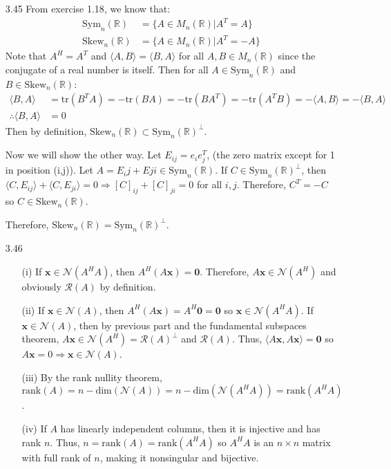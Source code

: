 \documentclass[letterpaper,12pt]{article}
\theoremstyle{definition}
\begin{document}
\begin{enumerate}
        \item[3.45]
        From exercise 1.18, we know that:
        \begin{align*}
          \text{Sym}_n(\mathbb{R}) &= \{A \in M_n(\mathbb{R}) | A^T = A\} \\
          \text{Skew}_n(\mathbb{R}) &= \{A \in M_n(\mathbb{R}) | A^T = -A\}
        \end{align*}
        Note that $A^H = A^T$ and $\langle A, B \rangle = \langle B, A \rangle$ for all $A, B \in M_n(\mathbb{R})$ since the conjugate of a real number is itself. Then for all $A \in \text{Sym}_n(\mathbb{R})$ and $B \in \text{Skew}_n(\mathbb{R})$:
          \begin{align*}
            \langle B, A \rangle &= \text{tr}(B^TA) = -\text{tr}(BA) = -\text{tr}(BA^T) = -\text{tr}(A^TB) = - \langle A, B \rangle = - \langle B, A \rangle \\
            \therefore \langle B, A \rangle &= 0
          \end{align*}
          Then by definition, $\text{Skew}_n(\mathbb{R}) \subset \text{Sym}_n(\mathbb{R})^\perp$.

          Now we will show the other way. Let $E_{ij} = e_ie_j^T$, (the zero matrix except for 1 in position (i,j)). Let $A = E_ij + Eji \in \text{Sym}_n(\mathbb{R})$. If $C \in \text{Sym}_n(\mathbb{R})^\perp$, then $\langle C, E_{ij} \rangle + \langle C, E_{ji} \rangle = 0 \Longrightarrow [C]_{ij} + [C]_{ji} = 0$ for all $i, j$. Therefore, $C^T = -C$ so $C \in \text{Skew}_n(\mathbb{R})$.

          Therefore,  $\text{Skew}_n(\mathbb{R}) = \text{Sym}_n(\mathbb{R})^\perp$.

        \item[3.46]
          \begin{enumerate}
            \item[(i)]
            If $\mathbf{x} \in \mathscr{N}(A^HA)$, then $A^H(A\mathbf{x}) = \mathbf{0}$. Therefore, $A\mathbf{x} \in \mathscr{N}(A^H)$ and obviously $\mathscr{R}(A)$ by definition.
            \item[(ii)]
            If $\mathbf{x} \in \mathscr{N}(A)$, then $A^H(A\mathbf{x}) = A^H\mathbf{0} = \mathbf{0}$ so $\mathbf{x} \in \mathscr{N}(A^HA)$.
            If $\mathbf{x} \in \mathscr{N}(A)$, then by previous part and the fundamental subspaces theorem, $A\mathbf{x} \in \mathscr{N}(A^H) = \mathscr{R}(A)^\perp$ and $\mathscr{R}(A)$. Thus, $\langle A\mathbf{x}, A\mathbf{x} \rangle = \mathbf{0}$ so $A\mathbf{x} = 0 \Longrightarrow \mathbf{x} \in \mathscr{N}(A)$.
            \item[(iii)]
            By the rank nullity theorem, $\text{rank}(A) = n - \text{dim}(\mathscr{N}(A)) = n - \text{dim}(\mathscr{N}(A^HA)) = \text{rank}(A^HA)$.
            \item[(iv)]
            If $A$ has linearly independent columns, then it is injective and has rank $n$. Thus, $ n = \text{rank}(A) = \text{rank}(A^HA)$ so $A^HA$ is an $n \times n$ matrix with full rank of $n$, making it nonsingular and bijective.
          \end{enumerate}


\end{enumerate}
\end{document}
